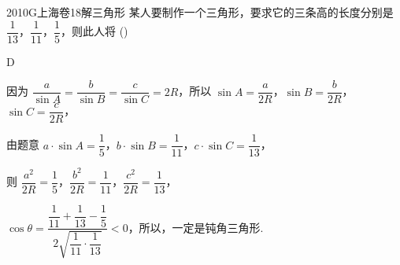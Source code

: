 
\begin{problem}{2010}{G}{上海卷}{18}{解三角形}
某人要制作一个三角形，要求它的三条高的长度分别是 $ \dfrac{1}{13} $，$ \dfrac{1}{11} $，$ \dfrac{1}{5} $，则此人将 (\hspace{1cm})
\begin{choices}
\end{choices}
\end{problem}

\begin{answer}
D
\end{answer}

\begin{solutions}
因为 $ \dfrac{a}{\sin A} = \dfrac{b}{\sin B} = \dfrac{c}{\sin C} = 2R $，所以 $ \sin A = \dfrac{a}{2R} $，$ \sin B = \dfrac{b}{2R} $，$ \sin C = \dfrac{c}{2R} $，

由题意 $ a \cdot \sin A = \dfrac{1}{5} $，$ b \cdot \sin B = \dfrac{1}{11} $，$ c \cdot \sin C = \dfrac{1}{13} $，

则 $ \dfrac{a^2}{2R} = \dfrac{1}{5} $，$ \dfrac{b^2}{2R} = \dfrac{1}{11} $，$ \dfrac{c^2}{2R} = \dfrac{1}{13} $，

$ \cos \theta = \dfrac{ \dfrac{1}{11} + \dfrac{1}{13} - \dfrac{1}{5} }{ 2 \sqrt{ \dfrac{1}{11} \cdot \dfrac{1}{13} } } < 0 $，所以，一定是钝角三角形.
\end{solutions}